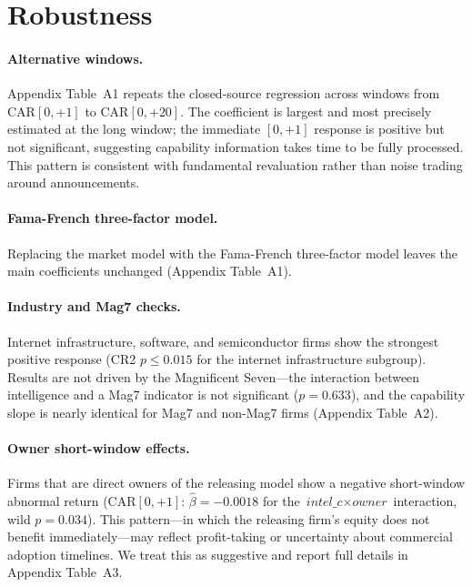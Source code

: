 \documentclass[12pt]{article}
\begin{document}
\section{Robustness}
\label{sec:robust}

\paragraph{Alternative windows.}
Appendix Table~A1 repeats the closed-source regression across windows from
CAR$[0,{+}1]$ to CAR$[0,{+}20]$. The coefficient is largest and most precisely
estimated at the long window; the immediate $[0,{+}1]$ response is positive but
not significant, suggesting capability information takes time to be fully
processed. This pattern is consistent with fundamental revaluation rather than
noise trading around announcements.

\paragraph{Fama-French three-factor model.}
Replacing the market model with the Fama-French three-factor model leaves the
main coefficients unchanged (Appendix Table~A1).

\paragraph{Industry and Mag7 checks.}
Internet infrastructure, software, and semiconductor firms show the strongest
positive response (CR2 $p \leq 0.015$ for the internet infrastructure subgroup).
Results are not driven by the Magnificent Seven---the interaction between
intelligence and a Mag7 indicator is not significant ($p = 0.633$), and the
capability slope is nearly identical for Mag7 and non-Mag7 firms (Appendix
Table~A2).

\paragraph{Owner short-window effects.}
Firms that are direct owners of the releasing model show a negative short-window
abnormal return (CAR$[0,{+}1]$: $\hat{\beta} = -0.0018$ for the
$\textit{intel\_c} \times \textit{owner}$ interaction, wild $p = 0.034$). This
pattern---in which the releasing firm's equity does not benefit immediately---may
reflect profit-taking or uncertainty about commercial adoption timelines. We treat
this as suggestive and report full details in Appendix Table~A3.
\end{document}
